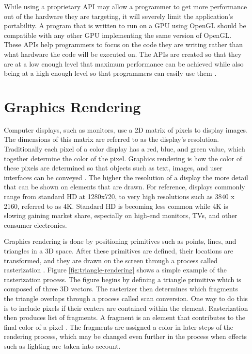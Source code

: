 \documentclass{article}
\begin{document}
While using a proprietary API may allow a programmer to get more performance out of the hardware they are targeting, it will severely limit the application's portability. A program that is written to run on a GPU using OpenGL should be compatible with any other GPU implementing the same version of OpenGL. These APIs help programmers to focus on the code they are writing rather than what hardware the code will be executed on. The APIs are created so that they are at a low enough level that maximum performance can be achieved while also being at a high enough level so that programmers can easily use them \cite[p.~4]{sellers2016}.

\section{Graphics Rendering}
Computer displays, such as monitors, use a 2D matrix of pixels to display images. The dimensions of this matrix are referred to as the display's resolution. Traditionally each pixel of a color display has a red, blue, and green value, which together determine the color of the pixel. Graphics rendering is how the color of these pixels are determined so that objects such as text, images, and user interfaces can be conveyed \cite{mckesson2018}. The higher the resolution of a display the more detail that can be shown on elements that are drawn. For reference, displays commonly range from standard HD at 1280x720, to very high resolutions such as 3840 x 2160, referred to as 4K. Standard HD is becoming less common while 4K is slowing gaining market share, especially on high-end monitors, TVs, and other consumer electronics.

Graphics rendering is done by positioning primitives such as points, lines, and triangles in a 3D space. After these primitives are defined, their locations are transformed, and they are drawn on the screen through a process called rasterization \cite{mckesson2018}. Figure \ref{fig:triangle-rendering} shows a simple example of the rasterization process. The figure begins by defining a triangle primitive which is composed of three 3D vectors. The rasterizer then determines which fragments the triangle overlaps through a process called scan conversion. One way to do this is to include pixels if their centers are contained within the element. Rasterization then produces list of fragments. A fragment is an element that contributes to the final color of a pixel \cite{sellers2016}. The fragments are assigned a color in later steps of the rendering process, which may be changed even further in the process when effects such as lighting are taken into account.
\end{document}
